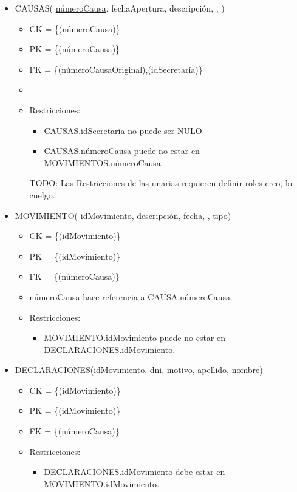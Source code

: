 \begin{itemize}
	
\item CAUSAS( \underline{númeroCausa}, fechaApertura, descripción, , )
	\begin{itemize}
		\item CK = \{(númeroCausa)\}
		\item PK = \{(númeroCausa)\}
		\item FK = \{(númeroCausaOriginal),(idSecretaría)\}
		\item 
		\item Restricciones:
			\begin{itemize}
			\item CAUSAS.idSecretaría no puede ser NULO.
			\item CAUSAS.númeroCausa puede no estar en MOVIMIENTOS.númeroCausa.
			\\
			\end{itemize}
			TODO: Las Restricciones de las unarias requieren definir roles creo, lo cuelgo.
	\end{itemize}

	
\item MOVIMIENTO( \underline{idMovimiento}, descripción, fecha, , tipo)
	\begin{itemize}
		\item CK = \{(idMovimiento)\}
		\item PK = \{(idMovimiento)\}
		\item FK = \{(númeroCausa)\}
		\item númeroCausa hace referencia a CAUSA.númeroCausa.
		\item Restricciones:
			\begin{itemize}
			\item MOVIMIENTO.idMovimiento puede no estar en DECLARACIONES.idMovimiento.
			\\
			\end{itemize}
	\end{itemize} 
	
\item DECLARACIONES(\underline{idMovimiento}, dni, motivo, apellido, nombre)
	\begin{itemize}
		\item CK = \{(idMovimiento)\}
		\item PK = \{(idMovimiento)\}
		\item FK = \{(númeroCausa)\}
		\item Restricciones:
			\begin{itemize}
			\item DECLARACIONES.idMovimiento debe estar en MOVIMIENTO.idMovimiento.
			\\
			\end{itemize}
	\end{itemize}
	
	
\end{itemize}		